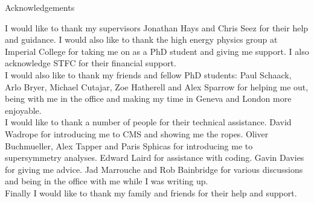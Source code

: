 {\bf \centerline{\Large Acknowledgements}}

\vspace{1cm}

I would like to thank my supervisors Jonathan Hays and Chris Seez for their help
and guidance. I would also like to thank the high energy physics group at
Imperial College for taking me on as a PhD student and giving me support. I also 
acknowledge STFC for their financial support. \\

I would also like to thank my friends and fellow PhD students: Paul Schaack, 
Arlo Bryer, Michael Cutajar, Zoe Hatherell and Alex Sparrow for helping me out, 
being with me in the office and making my time in Geneva and London more 
enjoyable. \\

I would like to thank a number of people for their technical assistance. David 
Wadrope for introducing me to CMS and showing me the ropes. Oliver Buchmueller, 
Alex Tapper and Paris Sphicas for introducing me to supersymmetry analyses.
Edward Laird for assistance with coding. Gavin Davies for giving me advice. Jad
Marrouche and Rob Bainbridge for various discussions and being in the office
with me while I was writing up. \\

Finally I would like to thank my family and friends for their help and support.
